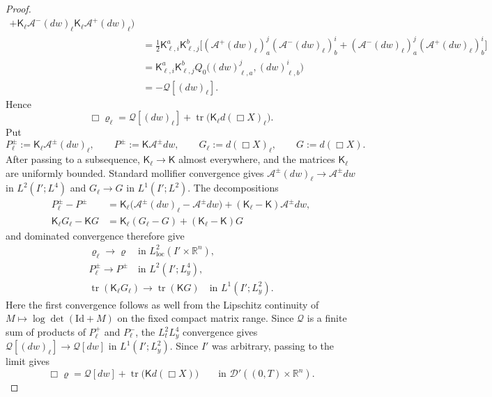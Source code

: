 \documentclass[11pt,reqno]{amsart}
\theoremstyle{plain}
\theoremstyle{definition}
\theoremstyle{remark}
\numberwithin{equation}{section}
\DeclareMathOperator{\tr}{tr}
\newcommand{\Kmat}{\mathsf K}
\newcommand{\Real}{\mathbb R}
\newcommand{\Rn}{\Real^n}
\begin{document}
\begin{proof}
\begin{align*}
      +\Kmat_\ell \mathcal A^-(dw)_\ell \Kmat_\ell \mathcal A^+(dw)_\ell
    \bigr)\\
 &=\frac12\Kmat_{\ell,i}^a\Kmat_{\ell,j}^b
   \Big[
      (\mathcal A^+(dw)_\ell)_a^j
      (\mathcal A^-(dw)_\ell)_b^i
     +(\mathcal A^-(dw)_\ell)_a^j
      (\mathcal A^+(dw)_\ell)_b^i
   \Big]\\
 &=\Kmat_{\ell,i}^a\Kmat_{\ell,j}^b
   Q_0\bigl((dw)_{\ell,a}^{ j},(dw)_{\ell,b}^{ i}\bigr)\\
 &=-\mathcal Q[(dw)_\ell].
\end{align*}
Hence
\begin{equation*}
    \Box\varrho_\ell
 =\mathcal Q[(dw)_\ell]
  +\tr\bigl(\Kmat_\ell d(\Box X)_\ell\bigr).
\end{equation*}
Put
\[
 P_\ell^\pm:=\Kmat_\ell\mathcal A^\pm(dw)_\ell,
 \qquad
 P^\pm:=\Kmat\mathcal A^\pm dw,
 \qquad
 G_\ell:=d(\Box X)_\ell,
 \qquad
 G:=d(\Box X).
\]
After passing to a subsequence, $\Kmat_\ell\to\Kmat$ almost everywhere,
and the matrices $\Kmat_\ell$ are uniformly bounded. Standard mollifier
convergence gives
$\mathcal A^\pm(dw)_\ell\to\mathcal A^\pm dw$ in
$L^2(I';L^4)$ and $G_\ell\to G$ in $L^1(I';L^2)$. The decompositions
\begin{align*}
 P_\ell^\pm-P^\pm
 &=\Kmat_\ell\bigl(\mathcal A^\pm(dw)_\ell
                    -\mathcal A^\pm dw\bigr)
   +(\Kmat_\ell-\Kmat)\mathcal A^\pm dw,\\
 \Kmat_\ell G_\ell-\Kmat G
 &=\Kmat_\ell(G_\ell-G)+(\Kmat_\ell-\Kmat)G
\end{align*}
and dominated convergence therefore give
\[
 \begin{gathered}
  \varrho_\ell\longrightarrow\varrho
  \quad\text{in }L^2_{\mathrm{loc}}(I'\times\Rn),\\
  P_\ell^\pm\longrightarrow P^\pm
  \quad\text{in }L^2(I';L^4_y),\\
  \tr(\Kmat_\ell G_\ell)\longrightarrow\tr(\Kmat G)
  \quad\text{in }L^1(I';L^2_y).
 \end{gathered}
\]
Here the first convergence follows as well from the Lipschitz continuity of
$M\mapsto\log\det(\mathrm{Id}+M)$ on the fixed compact matrix range. Since
$\mathcal Q$ is a finite sum of products of $P_\ell^+$ and $P_\ell^-$,
the $L^2_tL^4_y$ convergence gives
$\mathcal Q[(dw)_\ell]\to\mathcal Q[dw]$ in $L^1(I';L^2_y)$. Since $I'$ was
arbitrary, passing to the limit gives
\begin{equation}\label{eq:weak-jacobi}
 \Box\varrho
 =\mathcal Q[dw]+\tr\bigl(\Kmat d(\Box X)\bigr)
 \qquad\text{in }\mathcal D'((0,T)\times\Rn).
\end{equation}


\end{proof}
\end{document}
